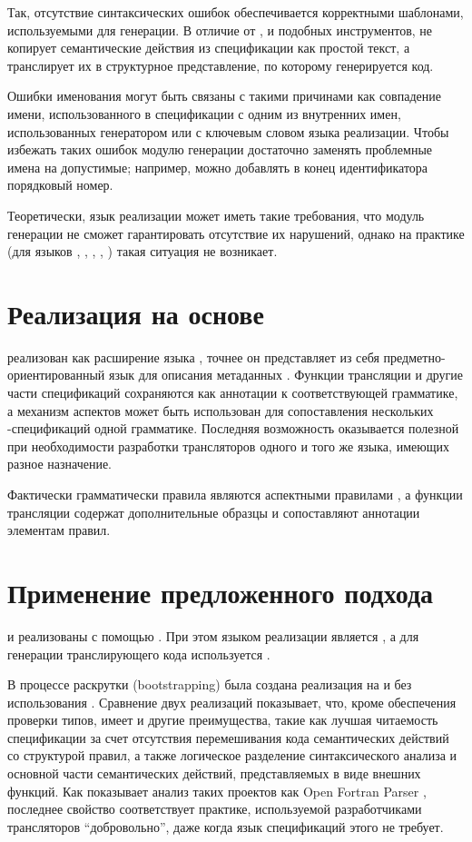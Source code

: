 Так, отсутствие синтаксических ошибок обеспечивается корректными шаблонами, используемыми для генерации. В отличие от ,  и подобных инструментов, \ATF{} не копирует семантические действия из спецификации как простой текст, а транслирует их в структурное представление, по которому генерируется код.

Ошибки именования могут быть связаны с такими причинами как совпадение имени, использованного в спецификации с одним из внутренних имен, использованных генератором или с ключевым словом языка реализации. Чтобы избежать таких ошибок модулю генерации достаточно заменять проблемные имена на допустимые; например, можно добавлять в конец идентификатора порядковый номер.

Теоретически, язык реализации может иметь такие требования, что модуль генерации не сможет гарантировать отсутствие их нарушений, однако на практике (для языков , , , , ) такая ситуация не возникает.

\chapter{Реализация на основе \GRM{}}

\ATF{} реализован как расширение языка \GRM{}, точнее он представляет из себя предметно-ориентированный язык для описания метаданных \GRM{}. Функции трансляции и другие части спецификаций \ATF{} сохраняются как аннотации к соответствующей грамматике, а механизм аспектов может быть использован для сопоставления нескольких \ATF{}-спецификаций одной грамматике. Последняя возможность оказывается полезной при необходимости разработки трансляторов одного и того же языка, имеющих разное назначение.

Фактически грамматически правила \ATF{} являются аспектными правилами \GRM{}, а функции трансляции содержат дополнительные образцы и сопоставляют аннотации элементам правил.

\chapter{Применение предложенного подхода}

\GRM{} и \ATF{} реализованы с помощью \ATF{}. При этом языком реализации является , а для генерации транслирующего кода используется . 

В процессе раскрутки (bootstrapping) была создана реализация на  и  без использования \ATF{}. Сравнение двух реализаций показывает, что, кроме обеспечения проверки типов, \ATF{} имеет и другие преимущества, такие как лучшая читаемость спецификации за счет отсутствия перемешивания кода семантических действий со структурой правил, а также логическое разделение синтаксического анализа и основной части семантических действий, представляемых в виде внешних функций. Как показывает анализ таких проектов как Open Fortran Parser \cite{???}, последнее свойство соответствует практике, используемой разработчиками трансляторов ``добровольно'', даже когда язык спецификаций этого не требует.

